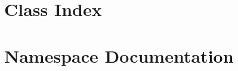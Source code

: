 \let\mypdfximage\pdfximage\def\pdfximage{\immediate\mypdfximage}\documentclass[twoside]{book}
\newcommand{\+}{\discretionary{\mbox{\scriptsize$\hookleftarrow$}}{}{}}
\begin{document}
\chapter{Class Index}

\chapter{Namespace Documentation}












\end{document}
